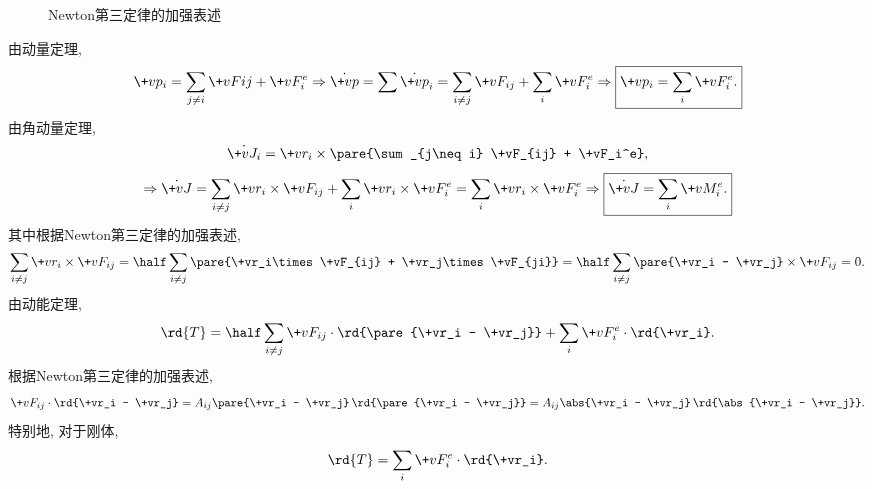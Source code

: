 \documentclass{ctexart}
\begin{document}
\begin{figure}[ht]
    \centering
    \caption{Newton第三定律的加强表述}
\end{figure}
由动量定理,
\[ \+vp_i = \sum_{j\neq i} \+vF{ij} + \+vF_i^e\Rightarrow \dot{\+vp} = \sum \dot{\+vp}_i = \sum_{i\neq j} \+vF_{ij} + \sum_i \+vF_i^e \Rightarrow \boxed{\+vp_i = \sum_i \+vF_i^e.} \]
由角动量定理,
\[ \dot{\+vJ_i} = \+vr_i\times\pare{\sum_{j\neq i} \+vF_{ij} + \+vF_i^e}, \]
\[ \Rightarrow \dot{\+vJ} = \sum_{i\neq j} \+vr_i\times\+vF_{ij} + \sum_i \+vr_i\times\+vF_i^e = \sum_i \+vr_i\times\+vF_i^e \Rightarrow \boxed{\dot{\+vJ} = \sum_i \+vM_i^e.} \]
其中根据Newton第三定律的加强表述,
\[ \sum_{i\neq j} \+vr_i\times\+vF_{ij} = \half \sum_{i\neq j} \pare{\+vr_i\times\+vF_{ij} + \+vr_j\times\+vF_{ji}}  = \half\sum_{i\neq j} \pare{\+vr_i - \+vr_j} \times\+vF_{ij} = 0. \]
由动能定理,
\[ \rd{T} = \half\sum_{i\neq j} \+vF_{ij}\cdot\rd{\pare{\+vr_i - \+vr_j}} + \sum_i \+vF_i^e\cdot\rd{\+vr_i}. \]
根据Newton第三定律的加强表述,
\[ \+vF_{ij}\cdot\rd{\+vr_i - \+vr_j} = A_{ij} \pare{\+vr_i - \+vr_j}\,\rd{\pare{\+vr_i - \+vr_j}} = A_{ij} \abs{\+vr_i - \+vr_j}\,\rd{\abs{\+vr_i - \+vr_j}}. \]
特别地, 对于刚体,
\[ \rd{T} = \sum_i \+vF_i^e \cdot\rd{\+vr_i}. \]



\end{document}
